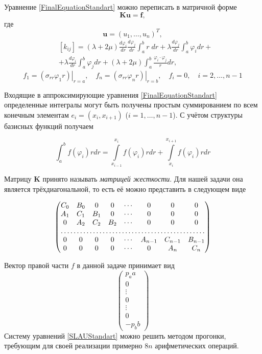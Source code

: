 \documentclass[a4paper,14pt]{extarticle}
\begin{document}
Уравнение \eqref{FinalEquationStandart} можно переписать в матричной форме
\begin{equation}\label{SLAUStandart}
\textbf{Ku}=\textbf{f},
\end{equation}
где
\begin{equation*}
\mathbf{u}=\left(u_1,\ldots,u_n\right)^T,
\end{equation*}
\begin{align*}
&\left[k_{ij}\right]=(\lambda+2\mu)\frac{d\varphi_i}{d r}\frac{d\varphi_j}{d r}\int_a^b{r\;dr}+\lambda\frac{d\varphi_j}{d r}\int_a^b{\varphi_i dr}+\\
&+\lambda\frac{d\varphi_i}{d r}\int_a^b{\varphi_j dr}+(\lambda+2\mu)\int_a^b{\frac{\varphi_i \cdot \varphi_j}{r}dr},
\end{align*}
\[
f_1=\left. (\sigma_{rr} \varphi_1 r)\right|_{r=a}, \quad f_n=\left. (\sigma_{rr} \varphi_n r)\right|_{r=b}, \quad f_i=0, \quad i=2,\ldots,n-1
\]

Входящие в аппроксимирующие уравнения \eqref{FinalEquationStandart} определенные интегралы могут быть получены простым суммированием по всем конечным элементам $e_i=(x_i,x_{i+1})$ ($i=1,\ldots,n-1$). С учётом структуры базисных функций получаем

{\normalsize
\begin{equation*}
\int_a^b{f(\varphi_i)rdr}=\int\limits_{x_{i-1}}^{x_i} {f(\varphi_i)rdr} + \int\limits_{x_{i}}^{x_{i+1}} {f(\varphi_i)rdr}
\end{equation*} }

Матрицу $\mathbf{K}$ принято называть \textit{матрицей жесткости}. Для нашей задачи она является трёхдиагональной, то есть её можно представить в следующем виде

\begin{equation*}
\begin{pmatrix}
C_0 & B_0 & 0 & 0 & \cdots & 0 & 0 & 0 \\
A_1 & C_1 & B_1 & 0 & \cdots & 0 & 0 & 0 \\
0 & A_2 & C_2 & B_2 & \cdots & 0 & 0 & 0 \\
\hdotsfor{8}\\
0 & 0 & 0 & 0 & \cdots & A_{n-1} & C_{n-1} & B_{n-1} \\ 
0 & 0 & 0 & 0 & \cdots & 0 & A_n & C_n 
\end{pmatrix}
\end{equation*}

Вектор правой части $f$ в данной задаче принимает вид
\[
\begin{pmatrix}
p_a a \\
0 \\
\vdots \\
0 \\
\vdots \\
0 \\
-p_b b
\end{pmatrix}
\]
Систему уравнений \eqref{SLAUStandart} можно решить методом прогонки, требующим для своей реализации примерно $8n$ арифметических операций.
\end{document}
